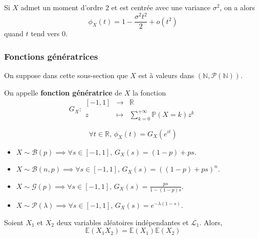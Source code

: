 	\begin{example}
		Si $X$ admet un moment d'ordre $2$ et est centrée avec une variance $\sigma^2$, on a alors
		\[ \phi_X(t) = 1 - \frac{\sigma^2 t^2}{2} + o(t^2) \]
		quand $t$ tend vers $0$.
	\end{example}
	
	\subsubsection{Fonctions génératrices}
	
	On suppose dans cette sous-section que $X$ est à valeurs dans $(\mathbb{N}, \mathcal{P}(\mathbb{N}))$.
	
	
	\begin{definition}
		On appelle \textbf{fonction génératrice} de $X$ la fonction
		\[
		G_X :
		\begin{array}{ccc}
			[-1,1] &\rightarrow& \mathbb{R} \\
			z &\mapsto& \sum_{k=0}^{+\infty} \mathbb{P}(X=k) z^k
		\end{array}
		\]
	\end{definition}
	
	
	\begin{remark}
		\[ \forall t \in \mathbb{R}, \, \phi_X(t) = G_X(e^{it}) \]
	\end{remark}
	
	
	\begin{example}
		\begin{itemize}
			\item $X \sim \mathcal{B}(p) \implies \forall s \in [-1,1], \, G_X(s) = (1-p) + ps$.
			\item $X \sim \mathcal{B}(n, p) \implies \forall s \in [-1,1], \, G_X(s) = ((1-p) + ps)^n$.
			\item $X \sim \mathcal{G}(p) \implies \forall s \in [-1,1], \, G_X(s) = \frac{ps}{1-(1-p)s}$.
			\item $X \sim \mathcal{P}(\lambda) \implies \forall s \in [-1,1], \, G_X(s) = e^{-\lambda (1-s)}$.
		\end{itemize}
	\end{example}
	
	\begin{theorem}
		Soient $X_1$ et $X_2$ deux variables aléatoires indépendantes et $\mathcal{L}_1$. Alors,
		\[ \mathbb{E}(X_1 X_2) = \mathbb{E}(X_1) \mathbb{E}(X_2) \]
	\end{theorem}
	
